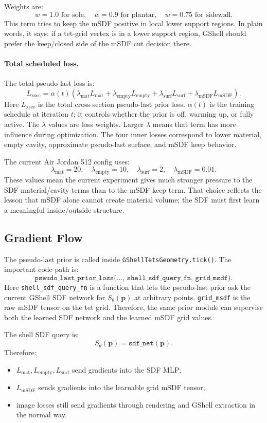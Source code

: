 \documentclass[11pt]{article}
\newcommand{\pt}{\mathbf{p}}
\begin{document}
Weights are:
\[
w=1.0 \text{ for sole},\quad
w=0.9 \text{ for plantar},\quad
w=0.75 \text{ for sidewall}.
\]
This term tries to keep the mSDF positive in local lower support regions.  In
plain words, it says: if a tet-grid vertex is in a lower support region, GShell
should prefer the keep/closed side of the mSDF cut decision there.

\paragraph{Total scheduled loss.}
The total pseudo-last loss is:
\[
L_{\text{xsec}}
=
\alpha(t)
\left(
\lambda_{\text{mat}}L_{\text{mat}}
+\lambda_{\text{empty}}L_{\text{empty}}
+\lambda_{\text{surf}}L_{\text{surf}}
+\lambda_{\text{mSDF}}L_{\text{mSDF}}
\right).
\]
Here \(L_{\text{xsec}}\) is the total cross-section pseudo-last prior loss.
\(\alpha(t)\) is the training schedule at iteration \(t\); it controls whether
the prior is off, warming up, or fully active.  The \(\lambda\) values are loss
weights.  Larger \(\lambda\) means that term has more influence during
optimization.  The four inner losses correspond to lower material, empty
cavity, approximate pseudo-last surface, and mSDF keep behavior.

The current Air Jordan 512 config uses:
\[
\lambda_{\text{mat}}=20,\quad
\lambda_{\text{empty}}=10,\quad
\lambda_{\text{surf}}=2,\quad
\lambda_{\text{mSDF}}=0.01.
\]
These values mean the current experiment gives much stronger pressure to the
SDF material/cavity terms than to the mSDF keep term.  That choice reflects the
lesson that mSDF alone cannot create material volume; the SDF must first learn
a meaningful inside/outside structure.

\subsection{Gradient Flow}

The pseudo-last prior is called inside \texttt{GShellTetsGeometry.tick()}.
The important code path is:
\[
\texttt{pseudo\_last\_prior\_loss(..., shell\_sdf\_query\_fn, grid\_msdf)}.
\]
Here \texttt{shell\_sdf\_query\_fn} is a function that lets the pseudo-last prior
ask the current GShell SDF network for \(S_\theta(\pt)\) at arbitrary points.
\texttt{grid\_msdf} is the raw mSDF tensor on the tet grid.  Therefore, the
same prior module can supervise both the learned SDF network and the learned
mSDF grid values.

The shell SDF query is:
\[
S_\theta(\pt)=\texttt{sdf\_net}(\pt).
\]
Therefore:
\begin{itemize}
    \item \(L_{\text{mat}}, L_{\text{empty}}, L_{\text{surf}}\) send gradients
    into the SDF MLP;
    \item \(L_{\text{mSDF}}\) sends gradients into the learnable grid mSDF
    tensor;
    \item image losses still send gradients through rendering and GShell
    extraction in the normal way.
\end{itemize}
\end{document}
